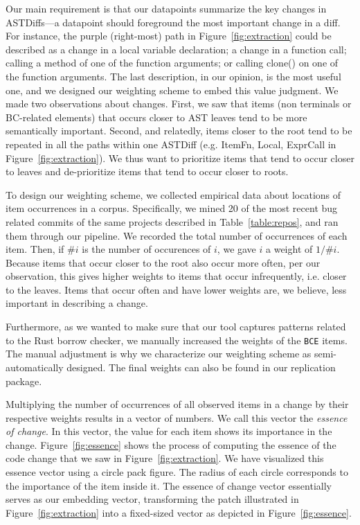 Our main requirement is that our datapoints summarize the key changes in ASTDiffs---a datapoint should foreground the most important change in a diff. For instance, the purple (right-most) path in Figure~\ref{fig:extraction} could be described as a change in a local variable declaration; a change in a function call; calling a method of one of the function arguments; or calling clone() on one of the function arguments. The last description, in our opinion, is the most useful one, and we designed our weighting scheme to embed this value judgment.
We made two observations about changes. First, we saw that items (non terminals or BC-related elements) that occurs closer to AST leaves tend to be more semantically important. Second, and relatedly, items closer to the root tend to be repeated in all the paths within one ASTDiff (e.g. ItemFn, Local, ExprCall in Figure~\ref{fig:extraction}). We thus want to prioritize items that tend to occur closer to leaves and de-prioritize items that tend to occur closer to roots.

To design our weighting scheme, we collected empirical data about locations of item occurrences in a corpus. Specifically, we mined 20 of the most recent bug related commits of the same projects described in Table~\ref{table:repos}, and ran them through our pipeline. We recorded the total number of occurrences of each item. Then, if $\# i$ is the number of occurences of $i$, we gave $i$ a weight of $1/\# i$. Because items that occur closer to the root also occur more often, per our observation, this gives higher weights to items that occur infrequently, i.e. closer to the leaves. Items that occur often and have lower weights are, we believe, less important in describing a change.

Furthermore, as we wanted to make sure that our tool captures patterns related to the Rust borrow checker, we manually increased the weights of the \texttt{BCE} items. The manual adjustment is why we characterize our weighting scheme as semi-automatically designed. The final weights can also be found in our replication package.

Multiplying the number of occurrences of all observed items in a change by their respective weights results in a vector of numbers. We call this vector the \emph{essence of change}. In this vector, the value for each item shows its importance in the change. Figure~\ref{fig:essence} shows the process of computing the essence of the code change that we saw in Figure~\ref{fig:extraction}. We have visualized this essence vector using a circle pack figure. The radius of each circle corresponds to the importance of the item inside it. The essence of change vector essentially serves as our embedding vector, transforming the patch illustrated in Figure~\ref{fig:extraction} into a fixed-sized vector as depicted in Figure~\ref{fig:essence}.

